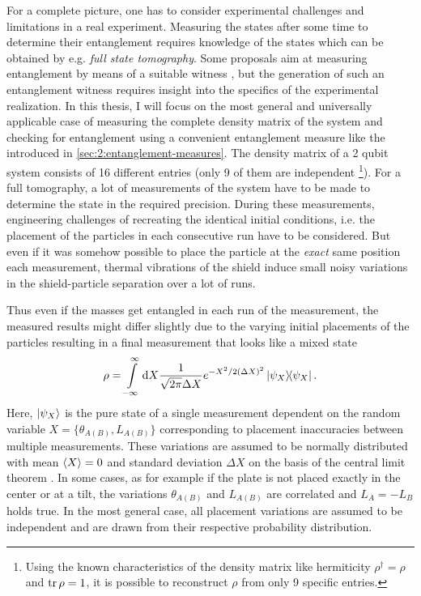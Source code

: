 For a complete picture, one has to consider experimental challenges and limitations in a real experiment. 
Measuring the states after some time to determine their entanglement requires knowledge of the states which can be obtained by e.g. \emph{full state tomography}.
Some proposals aim at measuring entanglement by means of a suitable witness \cite{Bose_2017,Chevalier_2020}, but the generation of such an entanglement witness requires insight into the specifics of the experimental realization.
In this thesis, I will focus on the most general and universally applicable case of measuring the complete density matrix of the system and checking for entanglement using a convenient entanglement measure like the  \cite{Plenio_2005} introduced in \cref{sec:2:entanglement-measures}.
The density matrix of a 2 qubit system consists of 16 different entries (only 9 of them are independent \footnote{Using the known characteristics of the density matrix like hermiticity $\rho^\dagger = \rho$ and $\tr \rho = 1$, it is possible to reconstruct $\rho$ from only 9 specific entries.}).
For a full tomography, a lot of measurements of the system have to be made to determine the state in the required precision.
During these measurements, engineering challenges of recreating the identical initial conditions, i.e. the placement of the particles in each consecutive run have to be considered.
But even if it was somehow possible to place the particle at the \textit{exact} same position each measurement, thermal vibrations of the shield induce small noisy variations in the shield-particle separation over a lot of runs.

Thus even if the masses get entangled in each run of the measurement, the measured results might differ slightly due to the varying initial placements of the particles resulting in a final measurement that looks like a mixed state
\begin{equation}
  \rho = \int\limits_{-\infty}^{\infty} \dd X \frac{1}{\sqrt{2\pi}\Delta X} e^{-X^2/2(\Delta X)^2} \ketbra{\psi_X} .
\end{equation}
Here, $\ket{\psi_X}$ is the pure state of a single measurement dependent on the random variable $X = \{\theta_{A(B)}, L_{A(B)}\}$ corresponding to placement inaccuracies between multiple measurements.
These variations are assumed to be normally distributed with mean $\left\langle X\right\rangle = 0$ and standard deviation $\Delta X$ on the basis of the central limit theorem \cite[p. 1195]{Riley_2018}.
In some cases, as for example if the plate is not placed exactly in the center or at a tilt, the variations $\theta_{A(B)}$ and $L_{A(B)}$ are correlated and $L_A = -L_B$ holds true.
In the most general case, all placement variations are assumed to be independent and are drawn from their respective probability distribution.



